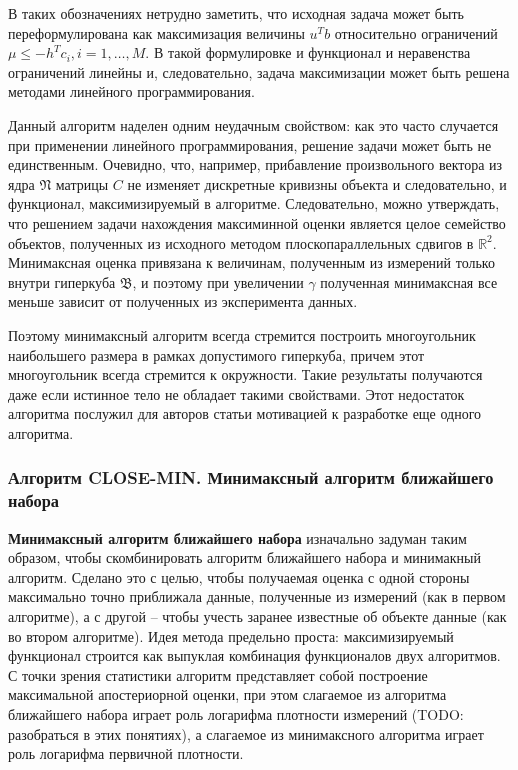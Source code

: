 \documentclass[a4paper, 12pt, titlepage]{article}
\theoremstyle{definition}
\theoremstyle{plain}
\theoremstyle{plain}
\begin{document}
В таких обозначениях нетрудно заметить, что исходная задача может
быть переформулирована как максимизация величины $u^{T} b$ относительно
ограничений $\mu \leq - h^{T} c_{i}, i = 1, \ldots, M$. В такой формулировке и
функционал и неравенства ограничений линейны и, следовательно, задача
максимизации может быть решена методами линейного программирования.

Данный алгоритм наделен одним неудачным свойством: как это часто случается при
применении линейного программирования, решение задачи может быть не
единственным. Очевидно, что, например, прибавление произвольного вектора из ядра
$\mathfrak{N}$ матрицы $C$ не изменяет дискретные кривизны объекта и
следовательно, и функционал, максимизируемый в алгоритме. Следовательно, можно
утверждать, что решением задачи нахождения максиминной оценки является целое
семейство объектов, полученных из исходного методом плоскопараллельных сдвигов в
$\mathbb{R}^{2}$. Минимаксная оценка привязана к величинам, полученным из
измерений только внутри гиперкуба $\mathfrak{B}$, и поэтому при увеличении
$\gamma$ полученная минимаксная все меньше зависит от полученных из эксперимента
данных.

Поэтому минимаксный алгоритм всегда стремится построить многоугольник
наибольшего размера в рамках допустимого гиперкуба, причем этот многоугольник
всегда стремится к окружности. Такие результаты получаются даже если истинное
тело не обладает такими свойствами. Этот недостаток алгоритма послужил для
авторов статьи мотивацией к разработке еще одного алгоритма.

\subsubsection{Алгоритм CLOSE-MIN. Минимаксный алгоритм ближайшего набора}
\label{sec:support-methods:2d-uniform:closemin}

\textbf{Минимаксный алгоритм ближайшего набора} изначально задуман таким
образом, чтобы скомбинировать алгоритм ближайшего набора и минимакный алгоритм.
Сделано это с целью, чтобы получаемая оценка с одной стороны максимально точно
приближала данные, полученные из измерений (как в первом алгоритме), а с другой
-- чтобы учесть заранее известные об объекте данные (как во втором алгоритме).
Идея метода предельно проста: максимизируемый функционал строится как выпуклая
комбинация функционалов двух алгоритмов. С точки зрения статистики алгоритм
представляет собой построение максимальной апостериорной оценки, при этом
слагаемое из алгоритма ближайшего набора играет роль логарифма плотности
измерений (TODO: разобраться в этих понятиях), а слагаемое из минимаксного
алгоритма играет роль логарифма первичной плотности.
\end{document}
